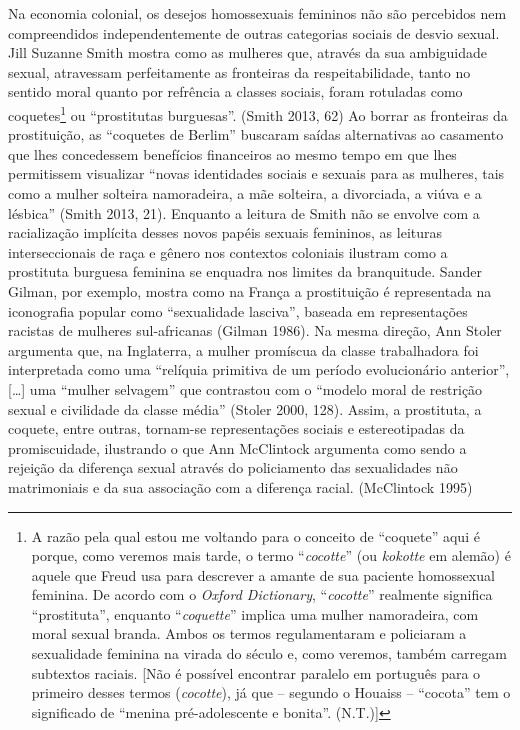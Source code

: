 Na economia colonial, os desejos homossexuais femininos não são
percebidos nem compreendidos independentemente de outras categorias
sociais de desvio sexual. Jill Suzanne Smith mostra como as mulheres
que, através da sua ambiguidade sexual, atravessam perfeitamente as
fronteiras da respeitabilidade, tanto no sentido moral quanto por
refrência a classes sociais, foram rotuladas como coquetes\footnote{A
  razão pela qual estou me voltando para o conceito de ``coquete'' aqui é
  porque, como veremos mais tarde, o termo ``\emph{cocotte}'' (ou
  \emph{kokotte} em alemão) é aquele que Freud usa para descrever a
  amante de sua paciente homossexual feminina. De acordo com o
  \emph{Oxford Dictionary}, ``\emph{cocotte}'' realmente significa
  ``prostituta'', enquanto ``\emph{coquette}'' implica uma mulher
  namoradeira, com moral sexual branda. Ambos os termos regulamentaram e
  policiaram a sexualidade feminina na virada do século e, como veremos,
  também carregam subtextos raciais. {[}Não é possível encontrar
  paralelo em português para o primeiro desses termos (\emph{cocotte}),
  já que -- segundo o Houaiss -- ``cocota'' tem o significado de
  ``menina pré-adolescente e bonita''. (N.T.){]}} ou ``prostitutas
    burguesas''. (Smith 2013, 62) Ao borrar as fronteiras da prostituição, as
``coquetes de Berlim'' buscaram saídas alternativas ao casamento que lhes
concedessem benefícios financeiros ao mesmo tempo em que lhes
permitissem visualizar ``novas identidades sociais e sexuais para as
mulheres, tais como a mulher solteira namoradeira, a mãe solteira, a
divorciada, a viúva e a lésbica'' (Smith 2013, 21). Enquanto a leitura de
Smith não se envolve com a racialização implícita desses novos papéis
sexuais femininos, as leituras interseccionais de raça e gênero nos
contextos coloniais ilustram como a prostituta burguesa feminina se
enquadra nos limites da branquitude. Sander Gilman, por exemplo, mostra
como na França a prostituição é representada na iconografia popular como
``sexualidade lasciva'', baseada em representações racistas de mulheres
sul-africanas (Gilman 1986). Na mesma direção, Ann Stoler argumenta que,
na Inglaterra, a mulher promíscua da classe trabalhadora foi
interpretada como uma ``relíquia primitiva de um período evolucionário
anterior'', {[}\ldots{}{]} uma ``mulher selvagem'' que contrastou com o ``modelo
moral de restrição sexual e civilidade da classe média'' (Stoler 2000,
128). Assim, a prostituta, a coquete, entre outras, tornam-se
representações sociais e estereotipadas da promiscuidade, ilustrando o
que Ann McClintock argumenta como sendo a rejeição da diferença sexual
através do policiamento das sexualidades não matrimoniais e da sua
associação com a diferença racial. (McClintock 1995)

